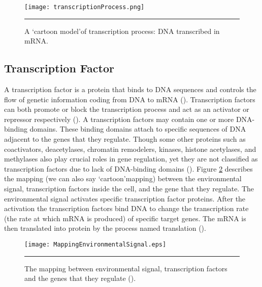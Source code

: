 \begin{figure}%
	\centering
		\texttt{[image: transcriptionProcess.png]}
		\rule{35em}{0.5pt}
	\caption{A \lq cartoon model\rq of transcription process: DNA transcribed in mRNA.}
	\label{fig:transcriptionProcess}
\end{figure}

\subsection{Transcription Factor}
A transcription factor is a protein that binds to DNA sequences and controls the flow of genetic information coding from DNA to mRNA (\cite{karin:1990, Latchman:1997}). Transcription factors can both promote or block the transcription process and act as an activator or repressor respectively (\cite{Lee:2000, Nikolov:1997, Roeder:1996}). A transcription factors may contain one or more DNA-binding domains. These binding domains attach to specific sequences of DNA adjacent to the genes that they regulate. Though some other proteins such as coactivators, deacetylases, chromatin remodelers, kinases, histone acetylases, and methylases also play crucial roles in gene regulation, yet they are not classified as transcription factors due to lack of DNA-binding domains (\cite{Mitchell:1989, Ptashne:1997, Brivanlou:2002}). Figure \ref{fig:MappingEnvironmentalSignal} describes the mapping (we can also say \lq cartoon\rq mapping) between the environmental signal, transcription factors inside the cell, and the gene that they regulate. The environmental signal activates specific transcription factor proteins. After the activation the transcription factors bind DNA to change the transcription rate (the rate at which mRNA is produced) of specific target genes. The mRNA is then translated into protein by the process named translation (\cite{Alon:2006}). 

\begin{figure}%
	\centering
		\texttt{[image: MappingEnvironmentalSignal.eps]}
		\rule{35em}{0.5pt}
	\caption[The mapping between environmental signal, transcription factors and the genes that they regulate]{The mapping between environmental signal, transcription factors and the genes that they regulate (\cite{Alon:2006}).}
	\label{fig:MappingEnvironmentalSignal}
\end{figure}

